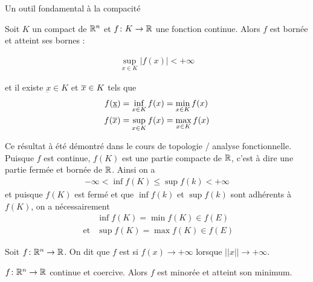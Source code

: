 \documentclass[french,a4paper,10pt]{article}
\begin{document}
	Un outil fondamental à la compacité
	
	\begin{oc-theorem}
		Soit $K$ un compact de $\mathbb{R}^n$ et $f\colon K\to \mathbb{R}$ une fonction continue. Alors $f$ est bornée et atteint ses bornes :
		
			\[\begin{aligned}
				\sup_{x\in K}|f(x)|<+\infty
			\end{aligned}\]
		
		et il existe $\underbar x\in K$ et $\overline{x}\in K$ tels que 
			\[\begin{aligned}
				f(\underbar x)&= \inf_{x\in K}f(x)=\min_{x\in K}f(x)\\
				f(\overline{x})&= \sup_{x\in K}f(x)=\max_{x\in K}f(x)\\
			\end{aligned}\]
	\end{oc-theorem}

	\begin{oc-proof}
		Ce résultat à été démontré dans le cours de topologie / analyse fonctionnelle. Puisque $f$ est continue, $f(K)$ est une partie compacte de $\mathbb{R}$, c'est à dire une partie fermée et bornée de $\mathbb{R}$. Ainsi on a
		\[\begin{aligned}
			-\infty<\inf f(K)\le \sup f(k)<+\infty
		\end{aligned}\]
		et puisque $f(K)$ est fermé et que $\inf f(k)$ et $\sup f(k)$ sont adhérents à $f(K)$, on a nécessairement
			\[\begin{aligned}
				&\inf f(K)=\min f(K)\in f(E)\\
				\text{ et}&\sup f(K)=\max f(K)\in f(E)
			\end{aligned}\]
	\end{oc-proof}
	\begin{oc-definition}
		Soit $f\colon\mathbb{R}^n\to \mathbb{R}$. On dit que $f$ est  si $f(x)\to+\infty$ lorsque $||x||\to+\infty$.
		
	\end{oc-definition}
	\begin{oc-theorem}
		$f\colon\mathbb{R}^n\to\mathbb{R}$ continue et coercive. Alors $f$ est minorée et atteint son minimum.
		
	\end{oc-theorem}
\end{document}
